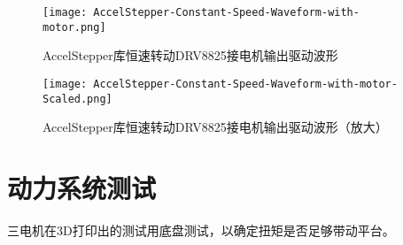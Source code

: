 \begin{figure}[htbp]
    \centering
    \texttt{[image: AccelStepper-Constant-Speed-Waveform-with-motor.png]}
    \caption{AccelStepper库恒速转动DRV8825接电机输出驱动波形}
    \label{fig:AccelStepper-Constant-Speed-Waveform-with-motor}
\end{figure}

\begin{figure}[htbp]
    \centering
    \texttt{[image: AccelStepper-Constant-Speed-Waveform-with-motor-Scaled.png]}
    \caption{AccelStepper库恒速转动DRV8825接电机输出驱动波形（放大）}
    \label{fig:AccelStepper-Constant-Speed-Waveform-with-motor-Scaled}
\end{figure}

\section{动力系统测试}

三电机在3D打印出的测试用底盘测试，以确定扭矩是否足够带动平台。